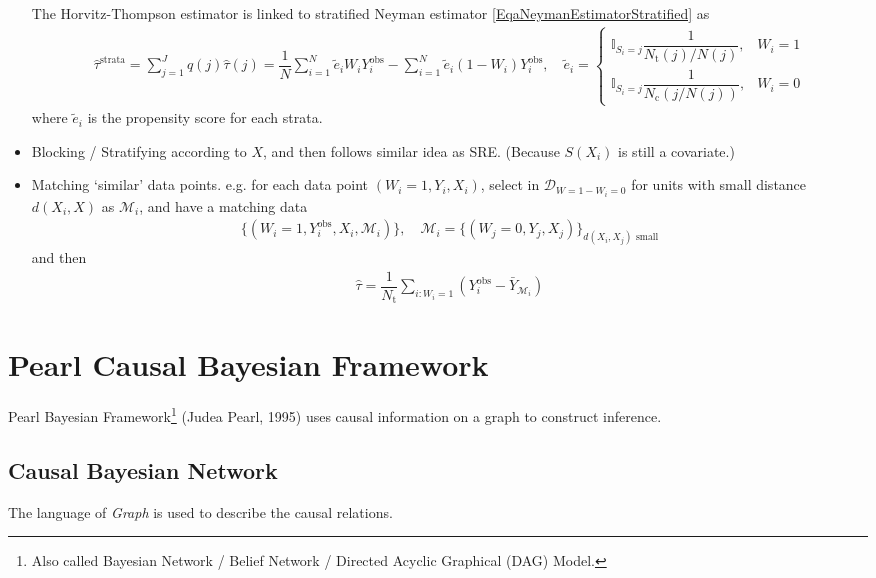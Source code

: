 \begin{itemize}[topsep=2pt,itemsep=0pt]
    The Horvitz-Thompson estimator is linked to stratified Neyman estimator \autoref{EqaNeymanEstimatorStratified} as
    \begin{align}
         \hat{\tau}^\mathrm{strata}=\sum_{j=1}^Jq(j)\hat{\tau}(j)= \dfrac{1}{N} \sum_{i=1}^N \tilde{e} _iW_iY^\mathrm{obs}_i-\sum_{i=1}^N\tilde{e} _i(1-W_i)Y^\mathrm{obs}_i ,\quad \tilde{e} _i=\begin{cases}
            \mathbb{I}_{S_i=j}\dfrac{1}{N_\mathrm{t}(j)/N(j) },&W_i=1\\
            \mathbb{I}_{S_i=j}\dfrac{1}{N_\mathrm{c}(j/N(j)) },&W_i=0
         \end{cases}
    \end{align}
    where $ \tilde{e }_i $ is the propensity score for each strata.
    \item Blocking / Stratifying according to $ X $, and then follows similar idea as SRE. (Because $ S(X_i) $ is still a covariate.)
    \item Matching `similar' data points. e.g. for each data point $ (W_i=1,Y_i,X_i) $, select in $ \mathcal{D}_{W=1-W_i=0} $ for units with small distance $ d(X_i,X) $ as $ \mathcal{M}_i $, and have a matching data
    \begin{align}
        \{(W_i=1,Y_i^\mathrm{obs} ,X_i,\mathcal{M}_i)\},\quad \mathcal{M}_i=\{(W_j=0,Y_j,X_j)\}_{d(X_i,X_j)\text{ small}} 
    \end{align}
    and then
    \begin{align}
        \hat{\tau} =\dfrac{1}{N_\mathrm{t} }\sum_{i:W_i=1}\left(Y_i^\mathrm{obs}-\bar{Y}_{\mathcal{M}_i} \right)
    \end{align}
\end{itemize}


\section{Pearl Causal Bayesian Framework}\label{SubSectionPearlCausalBayesianFramework}
    Pearl Bayesian Framework\footnote{Also called Bayesian Network / Belief Network / Directed Acyclic Graphical (DAG) Model.} (Judea Pearl, 1995) uses causal information on a graph to construct inference. 

    
\subsection{Causal Bayesian Network}
The language of \textit{Graph} is used to describe the causal relations. 

